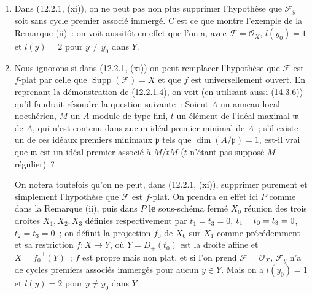 \begin{remarks}[12.2.3]
\begin{enumerate}[label=(\roman*)]
  \item Dans (12.2.1, (xi)), on ne peut pas non plus supprimer l'hypothèse que
  $\mathcal F_y$ soit sans cycle premier associé immergé. C'est ce que montre
  l'exemple de la Remarque (ii)~: on voit aussitôt en effet que l'on a, avec
  $\mathcal F=\mathcal O_X$, $l(y_0)=1$ et $l(y)=2$ pour $y\neq y_0$ dans $Y$.

  \item Nous ignorons si dans (12.2.1, (xi)) on peut remplacer l'hypothèse que
  $\mathcal F$ est $f$-plat par celle que $\operatorname{Supp}(\mathcal F)=X$
  et que $f$ est universellement ouvert. En reprenant la démonstration de
  (12.2.1.4), on voit (en utilisant aussi (14.3.6)) qu'il faudrait résoudre la
  question suivante~: Soient $A$ un anneau local noethérien, $M$ un $A$-module
  de type fini, $t$ un élément de l'idéal maximal $\mathfrak m$ de $A$, qui
  n'est contenu dans aucun idéal premier minimal de $A$~; s'il existe un de ces
  idéaux premiers minimaux $\mathfrak p$ tels que $\dim(A/\mathfrak p)=1$,
  est-il vrai que $\mathfrak m$ est un idéal premier associé à $M/tM$ ($t$
  n'étant pas supposé $M$-régulier)~?

  On notera toutefois qu'on ne peut, dans (12.2.1, (xi)), supprimer purement et
  simplement l'hypothèse que $\mathcal F$ est $f$-plat. On prendra en effet ici
  $P$ comme dans la Remarque (ii), puis dans $P$ l\textbf{e} sous-schéma fermé $X_0$
  réunion des trois droites $X_1,X_2,X_3$ définies respectivement par
  $t_1=t_3=0$, $t_1- t_0=t_3=0$, $t_2=t_3=0$~; on définit la projection $f_0$ de
  $X_0$ sur $X_1$ comme précédemment et sa restriction $f:X\to Y$, où
  $Y=D_+(t_0)$ est la droite affine et $X=f_0^{-1}(Y)$~; $f$ est propre mais
  non plat, et si l'on prend $\mathcal F=\mathcal O_X$, $\mathcal F_y$ n'a de
  cycles premiers associés immergés pour aucun $y\in Y$. Mais on a $l(y_0)=1$
  et $l(y)=2$ pour $y\neq y_0$ dans $Y$.
\end{enumerate}
\end{remarks}

